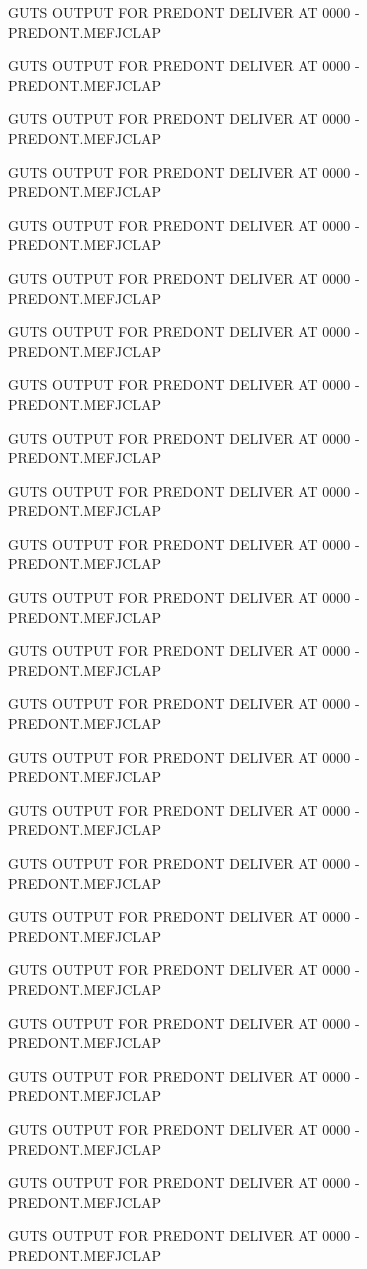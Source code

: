 GUTS OUTPUT FOR PREDONT DELIVER AT 0000 - PREDONT.MEFJCLAP

GUTS OUTPUT FOR PREDONT DELIVER AT 0000 - PREDONT.MEFJCLAP

GUTS OUTPUT FOR PREDONT DELIVER AT 0000 - PREDONT.MEFJCLAP

GUTS OUTPUT FOR PREDONT DELIVER AT 0000 - PREDONT.MEFJCLAP

GUTS OUTPUT FOR PREDONT DELIVER AT 0000 - PREDONT.MEFJCLAP

GUTS OUTPUT FOR PREDONT DELIVER AT 0000 - PREDONT.MEFJCLAP

GUTS OUTPUT FOR PREDONT DELIVER AT 0000 - PREDONT.MEFJCLAP

GUTS OUTPUT FOR PREDONT DELIVER AT 0000 - PREDONT.MEFJCLAP

GUTS OUTPUT FOR PREDONT DELIVER AT 0000 - PREDONT.MEFJCLAP

GUTS OUTPUT FOR PREDONT DELIVER AT 0000 - PREDONT.MEFJCLAP

GUTS OUTPUT FOR PREDONT DELIVER AT 0000 - PREDONT.MEFJCLAP

GUTS OUTPUT FOR PREDONT DELIVER AT 0000 - PREDONT.MEFJCLAP

GUTS OUTPUT FOR PREDONT DELIVER AT 0000 - PREDONT.MEFJCLAP

GUTS OUTPUT FOR PREDONT DELIVER AT 0000 - PREDONT.MEFJCLAP

GUTS OUTPUT FOR PREDONT DELIVER AT 0000 - PREDONT.MEFJCLAP

GUTS OUTPUT FOR PREDONT DELIVER AT 0000 - PREDONT.MEFJCLAP

GUTS OUTPUT FOR PREDONT DELIVER AT 0000 - PREDONT.MEFJCLAP

GUTS OUTPUT FOR PREDONT DELIVER AT 0000 - PREDONT.MEFJCLAP

GUTS OUTPUT FOR PREDONT DELIVER AT 0000 - PREDONT.MEFJCLAP

GUTS OUTPUT FOR PREDONT DELIVER AT 0000 - PREDONT.MEFJCLAP

GUTS OUTPUT FOR PREDONT DELIVER AT 0000 - PREDONT.MEFJCLAP

GUTS OUTPUT FOR PREDONT DELIVER AT 0000 - PREDONT.MEFJCLAP

GUTS OUTPUT FOR PREDONT DELIVER AT 0000 - PREDONT.MEFJCLAP

GUTS OUTPUT FOR PREDONT DELIVER AT 0000 - PREDONT.MEFJCLAP



